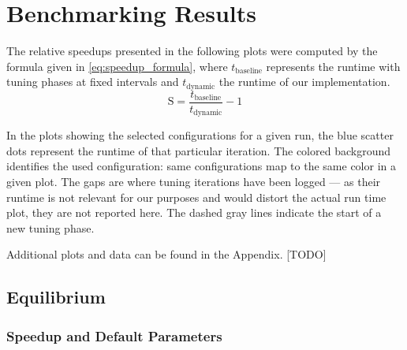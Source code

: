 




\section{Benchmarking Results}
\label{sec:benchmarking_results}

The relative speedups presented in the following plots were computed by the formula given in \eqref{eq:speedup_formula}, where $t_\text{baseline}$ represents the runtime with tuning phases at fixed intervals and $t_\text{dynamic}$ the runtime of our implementation.
\begin{equation}
	\text{S}=\frac{t_\text{baseline}}{t_\text{dynamic}}-1\label{eq:speedup_formula}
\end{equation}

In the plots showing the selected configurations for a given run, the blue scatter dots represent the runtime of that particular iteration. The colored background identifies the used configuration: same configurations map to the same color in a given plot. The gaps are where tuning iterations have been logged --- as their runtime is not relevant for our purposes and would distort the actual run time plot, they are not reported here. The dashed gray lines indicate the start of a new tuning phase.

Additional plots and data can be found in the Appendix. [TODO]

\newpage
\subsection{Equilibrium}
\subsubsection{Speedup and Default Parameters}

